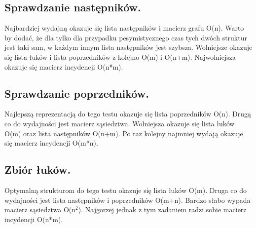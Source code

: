 \documentclass[polish,polish,a4paper]{article}
\begin{document}
\begin{spacing}{1.25}
\subsection{Sprawdzanie następników.}
Najbardziej wydajną okazuje się lista następników i macierz grafu O(n). Warto by dodać, że dla tylko dla przypadku pesymistycznego czas tych dwóch struktur jest taki sam, w każdym innym lista następników jest szybsza. Wolniejsze okazuje się lista łuków i lista poprzedników z kolejno O(m) i O(n+m). Najwolniejsza okazuje się macierz incydencji O(n*m).

\subsection{Sprawdzanie poprzedników.}
Najlepszą reprezentacją do tego testu okazuje się lista poprzedników O(n). Drugą co do wydajności jest macierz sąsiedztwa. Wolniejsza okazuje się lista łuków O(m) oraz lista następników O(n+m). Po raz kolejny najmniej wydają okazuje się macierz incydencji O(m*n).

\subsection{Zbiór łuków.}
Optymalną strukturom do tego testu okazuje się lista łuków O(m).  Druga co do  wydajności jest lista następników i poprzedników O(m+n). Bardzo słabo wypada macierz sąsiedztwa O(n$^2$). Najgorzej jednak z tym zadaniem radzi sobie macierz incydencji O(n*m).


\end{spacing}
	\newpage
	\tableofcontents
\end{document}
